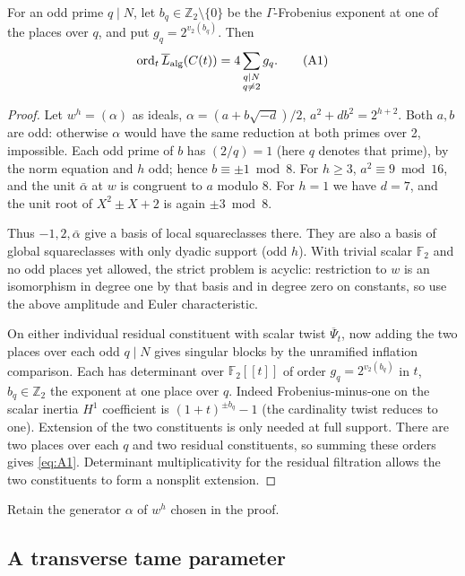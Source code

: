 \begin{lemma}
\label{split-measures:residual-order}
For an odd prime \(q\mid N\), let \(b_q\in\mathbb Z_2\setminus\{0\}\) be
the \(\Gamma\)-Frobenius exponent at one of the places over \(q\), and put
\(g_q=2^{v_2(b_q)}\).  Then
\[
 \operatorname{ord}_t\overline L_{\rm alg}(C(t))
   =4\sum_{\substack{q\mid N\\q\ne2}}g_q.
 \tag{A1}\label{eq:A1}
\]
\end{lemma}
\begin{proof}
Let \(w^h=(\alpha)\) as ideals, \(\alpha=(a+b\sqrt{-d})/2\), \(a^2+db^2=2^{h+2}\). Both \(a,b\) are odd: otherwise \(\alpha\) would have the same reduction at both primes over 2, impossible. Each odd prime of \(b\) has \((2/q)=1\) (here \(q\) denotes that prime), by the norm equation and \(h\) odd; hence \(b\equiv\pm1\bmod8\). For \(h\ge3\), \(a^2\equiv9\bmod16\), and the unit \(\bar\alpha\) at \(w\) is congruent to \(a\) modulo 8. For \(h=1\) we have \(d=7\), and the unit root of \(X^2\pm X+2\) is again \(\pm3\bmod8\). 

Thus \(-1,2,\bar\alpha\) give a basis of local squareclasses there. They are also a basis of global squareclasses with only dyadic support (odd \(h\)). With trivial scalar \(\mathbb F_2\) and no odd places yet allowed, the strict problem is acyclic: restriction to \(w\) is an isomorphism in degree one by that basis and in degree zero on constants, so use the above amplitude and Euler characteristic.

On either individual residual constituent with scalar twist \(\overline\Psi_t\), now adding the two places over each odd \(q\mid N\) gives singular blocks by the unramified inflation comparison. Each has determinant over \(\mathbb F_2[[t]]\) of order \(g_q=2^{v_2(b_q)}\) in \(t\), \(b_q\in\mathbb Z_2\) the exponent at one place over \(q\). Indeed Frobenius-minus-one on the scalar inertia \(H^1\) coefficient is \((1+t)^{\pm b_q}-1\) (the cardinality twist reduces to one). Extension of the two constituents is only needed at full support. There are two places over each \(q\) and two residual constituents, so
summing these orders gives \eqref{eq:A1}.  Determinant multiplicativity for
the residual filtration allows the two constituents to form a nonsplit
extension.
\end{proof}

Retain the generator \(\alpha\) of \(w^h\) chosen in the proof.

\subsection{A transverse tame parameter}

